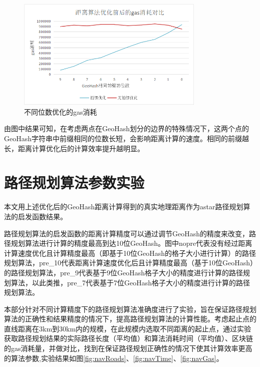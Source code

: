 \begin{figure}[h]
  \centering
  \includegraphics[height=0.3\textheight,width=0.8\textwidth]{figures/不同位数优化gas}
  \caption{不同位数优化的gas消耗}\label{fig:diffBetterGas}
\end{figure}

由图中结果可知，在考虑两点在GeoHash划分的边界的特殊情况下，这两个点的GeoHash字符串中前缀相同的位数长短，会影响距离计算的速度。相同的前缀越长，距离计算优化后的计算效率提升越明显。

\section{路径规划算法参数实验}
本文用上述优化后的GeoHash距离计算得到的真实地理距离作为astar路径规划算法的启发函数结果。

路径规划算法的启发函数的距离计算精度可以通过调节GeoHash的精度来改变，路径规划算法进行计算的精度最高到达10位GeoHash。图中nopre代表没有经过距离计算速度优化且计算精度最高（即基于10位GeoHash的格子大小进行计算）的路径规划算法，pre\_10代表距离计算速度优化后且计算精度最高（基于10位GeoHash）的路径规划算法，pre\_9代表基于9位GeoHash格子大小的精度进行计算的路径规划算法，以此类推，pre\_7代表基于7位GeoHash格子大小的精度进行计算的路径规划算法。

本部分针对不同计算精度下的路径规划算法准确度进行了实验，旨在保证路径规划算法的正确性和结果精度的情况下，提高路径规划算法的计算性能。考虑起止点的直线距离在3km到30km内的规模，在此规模内选取不同距离的起止点，通过实验获取路径规划结果的实际路径长度（平均值）和算法消耗时间（平均值）、区块链的gas消耗量，并做对比，找到在保证路径规划正确性的情况下使其计算效率更高的算法参数,实验结果如图\ref{fig:navRoads}、\ref{fig:navTime}、\ref{fig:navGas}。

